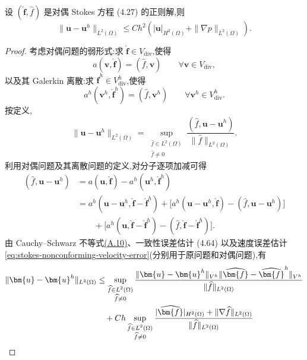\begin{theorem}\label{thm:stokes-nonconforming-velocity-l2-error}
设 $(\widehat{\bm{f}},\widehat f)$ 是对偶 Stokes 方程 (4.27) 的正则解,则
\begin{equation}\label{eq:stokes-nonconforming-velocity-l2-error}
  \|\bm{u}-\bm{u}^h\|_{L^2(\Omega)}
  \leq Ch^2\left(|\bm{u}|_{H^2(\Omega)}
       +\|\nabla p\|_{L^2(\Omega)}\right).
\end{equation}
\end{theorem}
\begin{proof}
考虑对偶问题的弱形式:求 $\widehat{\bm{f}}\in V_{\mathrm{div}}$,使得
\[
  a(\bm{v},\widehat{\bm{f}})
  =(\widehat f,\bm{v})\qquad\forall\bm{v}\in V_{\mathrm{div}},
\]
以及其 Galerkin 离散:求 $\widehat{\bm{f}}^h\in V_{\mathrm{div}}^h$,使得
\[
  a^h(\bm{v}^h,\widehat{\bm{f}}^h)
  =(\widehat f,\bm{v}^h)\qquad\forall\bm{v}^h\in V_{\mathrm{div}}^h.
\]
按定义,
\[
  \|\bm{u}-\bm{u}^h\|_{L^2(\Omega)}
  =\sup_{\substack{\widehat f\in L^2(\Omega)\\\widehat f\ne0}}
   \frac{(\widehat f,\bm{u}-\bm{u}^h)}
        {\|\widehat f\|_{L^2(\Omega)}}.
\]
利用对偶问题及其离散问题的定义,对分子逐项加减可得
\[
\begin{aligned}
 (\widehat f,\bm{u}-\bm{u}^h)
 &=a(\bm{u},\widehat{\bm{f}})
      -a^h(\bm{u}^h,\widehat{\bm{f}}^h)\\
 &=a^h(\bm{u}-\bm{u}^h,
         \widehat{\bm{f}}-\widehat{\bm{f}}^h)
   +\bigl[a^h(\bm{u}-\bm{u}^h,\widehat{\bm{f}})
       -(\widehat f,\bm{u}-\bm{u}^h)\bigr]\\
 &\qquad+\bigl[a^h(\bm{u},\widehat{\bm{f}}-\widehat{\bm{f}}^h)
       -(\widehat f,\widehat{\bm{f}}-\widehat{\bm{f}}^h)\bigr].
\end{aligned}
\]
由 Cauchy--Schwarz 不等式\hyperref[eq:appendix-a-10]{(A.10)}、一致性误差估计 (4.64) 以及速度误差估计\cref{eq:stokes-nonconforming-velocity-error}(分别用于原问题和对偶问题),有
{\fontsize{9.8pt}{12pt}\selectfont
\begin{align}
  \|\bm{u}-\bm{u}^h\|_{L^2(\Omega)}
  &\leq\sup_{\substack{\widehat f\in L^2(\Omega)\\\widehat f\ne0}}
   \frac{\|\bm{u}-\bm{u}^h\|_{V^h}
         \|\widehat{\bm{f}}-\widehat{\bm{f}}^h\|_{V^h}}
        {\|\widehat f\|_{L^2(\Omega)}}\notag\\
  &\quad+Ch\sup_{\substack{\widehat f\in L^2(\Omega)\\\widehat f\ne0}}
   \frac{|\widehat{\bm{f}}|_{H^2(\Omega)}
       +\|\nabla\widehat f\|_{L^2(\Omega)}}{\|\widehat f\|_{L^2(\Omega)}}

\end{align}}
\end{proof}
